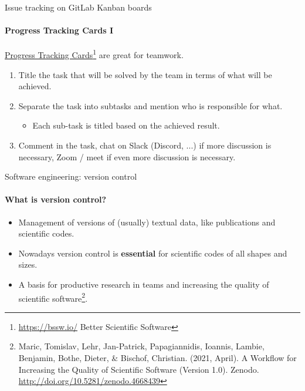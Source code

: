\documentclass[
	aspectratio=169,%
	color={accentcolor=2d},
	logo=true,%
	colorframetitle=true,%
	]{tudabeamer}
\begin{document}
\begin{frame}{Issue tracking on GitLab Kanban boards} 
    \framesubtitle{Progress Tracking Cards I}
    \vfill

    \href{}{Progress Tracking Cards}\footnote{\href{https://bssw.io/}{https://bssw.io/} Better Scientific Software} are great for teamwork.
    \begin{enumerate}  
        \item Title the task that will be solved by the team in terms of what will be achieved.
        \item Separate the task into subtasks and mention who is responsible for what. 
            \begin{itemize}
                \item Each sub-task is titled based on the achieved result.
            \end{itemize}
        \item Comment in the task, chat on Slack (Discord, ...) if more discussion is necessary, Zoom / meet if even more discussion is necessary.
    \end{enumerate}

\end{frame}

\begin{frame}{Software engineering: version control}
    \framesubtitle{What is version control?}

    \vfill
    \begin{itemize}
        \item Management of versions of (usually) textual data, like publications and scientific codes.
        \item Nowadays version control is \textbf{essential} for scientific codes of all shapes and sizes.
        \item A basis for productive research in teams and increasing the quality of scientific software\footnote{Maric, Tomislav, Lehr, Jan-Patrick, Papagiannidis, Ioannis, Lambie, Benjamin, Bothe, Dieter, \& Bischof, Christian. (2021, April). A Workflow for Increasing the Quality of Scientific Software (Version 1.0). Zenodo. \url{http://doi.org/10.5281/zenodo.4668439}}. 
    \end{itemize}


\end{frame}
\end{document}
